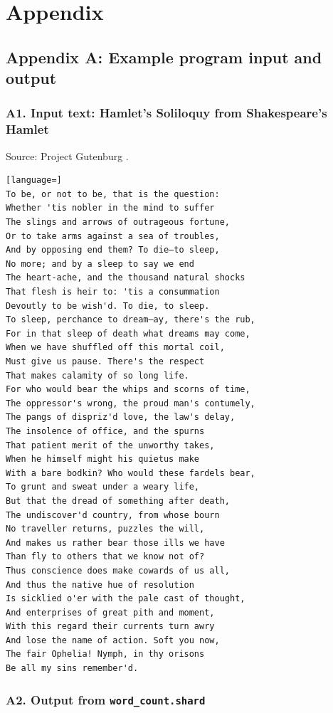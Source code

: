 \documentclass[twoside]{report}
\newcommand{\todoi}[1]{\todo[inline, color=blue!20]{TODO: {#1}}}
\begin{document}
\todoi{Write this chapter}

\chapter{Appendix}
\section{Appendix A: Example program input and output}

\subsection{A1. Input text: Hamlet's Soliloquy from Shakespeare's Hamlet}

Source: Project Gutenburg \cite{hamlet}.

\begin{lstlisting}[language=]
To be, or not to be, that is the question:
Whether 'tis nobler in the mind to suffer
The slings and arrows of outrageous fortune,
Or to take arms against a sea of troubles,
And by opposing end them? To die—to sleep,
No more; and by a sleep to say we end
The heart-ache, and the thousand natural shocks
That flesh is heir to: 'tis a consummation
Devoutly to be wish'd. To die, to sleep.
To sleep, perchance to dream—ay, there's the rub,
For in that sleep of death what dreams may come,
When we have shuffled off this mortal coil,
Must give us pause. There's the respect
That makes calamity of so long life.
For who would bear the whips and scorns of time,
The oppressor's wrong, the proud man's contumely,
The pangs of dispriz'd love, the law's delay,
The insolence of office, and the spurns
That patient merit of the unworthy takes,
When he himself might his quietus make
With a bare bodkin? Who would these fardels bear,
To grunt and sweat under a weary life,
But that the dread of something after death,
The undiscover'd country, from whose bourn
No traveller returns, puzzles the will,
And makes us rather bear those ills we have
Than fly to others that we know not of?
Thus conscience does make cowards of us all,
And thus the native hue of resolution
Is sicklied o'er with the pale cast of thought,
And enterprises of great pith and moment,
With this regard their currents turn awry
And lose the name of action. Soft you now,
The fair Ophelia! Nymph, in thy orisons
Be all my sins remember'd.
\end{lstlisting}

\subsection{A2. Output from \texttt{word\_count.shard}}
\end{document}
